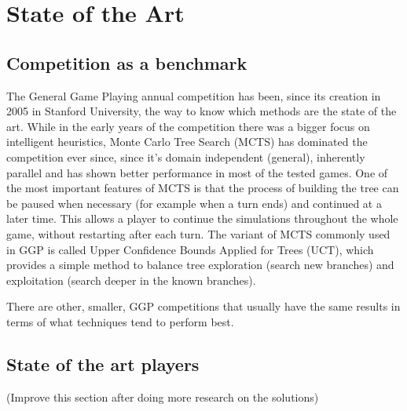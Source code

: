 \chapter{State of the Art}
\label{chapter:state_of_the_art}

\section{Competition as a benchmark}
The General Game Playing annual competition has been, since its creation in 2005 in Stanford University, the way to know which methods are the state of the art. 
While in the early years of the competition there was a bigger focus on intelligent heuristics, Monte Carlo Tree Search (MCTS) has dominated the competition ever since, since it’s domain independent (general), inherently parallel and has shown better performance in most of the tested games. One of the most important features of MCTS is that the process of building the tree can be paused when necessary (for example when a turn ends) and continued at a later time. This allows a player to continue the simulations throughout the whole game, without restarting after each turn.
The variant of MCTS commonly used in GGP is called Upper Confidence Bounds Applied for Trees (UCT), which provides a simple method to balance tree exploration (search new branches) and exploitation (search deeper in the known branches). 

There are other, smaller, \gls{GGP} competitions that usually have the same results in terms of what techniques tend to perform best.


\section{State of the art players}

(Improve this section after doing more research on the solutions)

